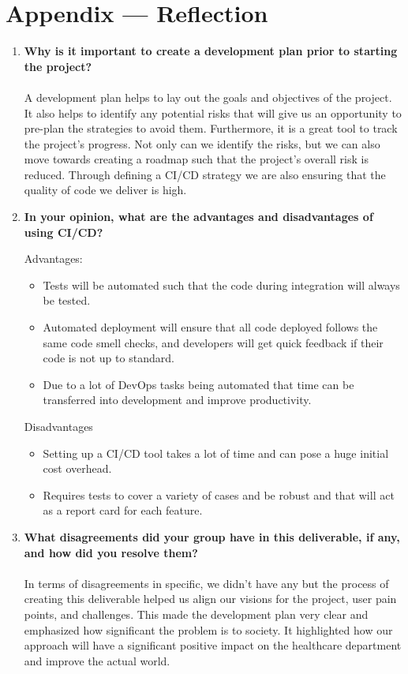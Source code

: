 \documentclass{article}
\begin{document}
\section*{Appendix --- Reflection}


% 

\begin{enumerate}
    \item \textbf{Why is it important to create a development plan prior to starting the project?}\\\\
    A development plan helps to lay out the goals and objectives of the project. It also helps to identify any potential risks that will give us an opportunity to pre-plan the strategies to avoid them. Furthermore, it is a great tool to track the project’s progress.
    Not only can we identify the risks, but we can also move towards creating a roadmap such that the project’s overall risk is reduced. Through defining a CI/CD strategy we are also ensuring that the quality of code we deliver is high. 

    \item \textbf{In your opinion, what are the advantages and disadvantages of using CI/CD?}

    Advantages:
    \begin{itemize}
    \item Tests will be automated such that the code during integration will always be tested.   
    \item Automated deployment will ensure that all code deployed follows the same code smell checks, and developers will get quick feedback if their code is not up to standard.
    \item Due to a lot of DevOps tasks being automated that time can be transferred into development and improve productivity.
    \end{itemize}

    Disadvantages
    \begin{itemize}
    \item Setting up a CI/CD tool takes a lot of time and can pose a huge initial cost overhead.  
    \item Requires tests to cover a variety of cases and be robust and that will act as a report card for each feature.
    \end{itemize}

    \item \textbf{What disagreements did your group have in this deliverable, if any, and how did you resolve them?}\\\\
    In terms of disagreements in specific, we didn’t have any but the process of creating this deliverable helped us align our visions for the project, user pain points, and challenges. This made the development plan very clear and emphasized how significant the problem is to society. It highlighted how our approach will have a significant positive impact on the healthcare department and improve the actual world.

\end{enumerate}
\end{document}

